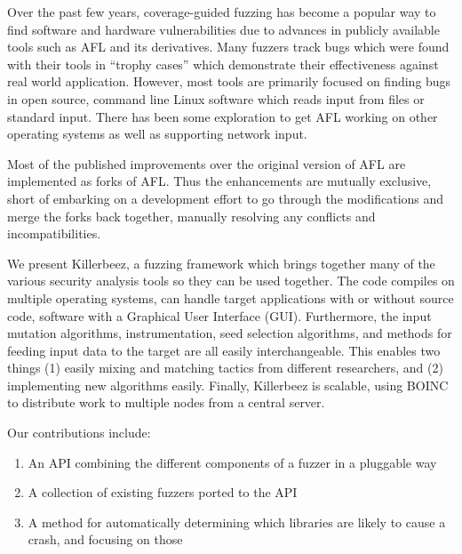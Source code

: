 Over the past few years, coverage-guided fuzzing has become a popular way to
find software and hardware vulnerabilities due to advances in publicly
available tools such as AFL\cite{afl} and its derivatives.\cite{vanhauser} Many
fuzzers track bugs which were found with their tools in ``trophy cases'' which
demonstrate their effectiveness against real world application.  However, most
tools are primarily focused on finding bugs in open source, command line Linux
software which reads input from files or standard input. There has been some
exploration to get AFL working on other operating
systems\cite{aflosx}\cite{winafl} as well as supporting network
input.\cite{netafl}\cite{preeny}

Most of the published improvements over the original version of AFL are
implemented as forks of
AFL.\cite{aflfast}\cite{aflgo}\cite{fairfuzz}\cite{perffuzz}\cite{pythia}\cite{collafl}
Thus the enhancements are mutually exclusive, short of embarking on a
development effort to go through the modifications and merge the forks back
together, manually resolving any conflicts and incompatibilities.

We present Killerbeez, a fuzzing framework which brings together many of the
various security analysis tools so they can be used together.  The code
compiles on multiple operating systems, can handle target applications with or
without source code, software with a Graphical User Interface (GUI).
Furthermore, the input mutation algorithms, instrumentation, seed selection
algorithms, and methods for feeding input data to the target are all easily
interchangeable.  This enables two things (1) easily mixing and matching
tactics from different researchers, and (2) implementing new algorithms easily.
Finally, Killerbeez is scalable, using BOINC\cite{boinc} to distribute work to
multiple nodes from a central server.

Our contributions include:
\begin{enumerate}[noitemsep]
\item An API combining the different components of a fuzzer in a pluggable way
\item A collection of existing fuzzers ported to the API
\item A method for automatically determining which libraries are likely to
	cause a crash, and focusing on those
\end{enumerate}
